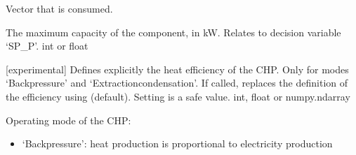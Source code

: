\documentclass[letterpaper,10pt,english]{sphinxmanual}
\begin{document}
\begin{fulllineitems}
\begin{fulllineitems}
\label{\detokenize{generated/tamos.production.CHP:tamos.production.CHP.energy_source}}
\pysigstartsignatures
{}
\pysigstopsignatures
\sphinxAtStartPar
Vector that is consumed.

\end{fulllineitems}


\begin{fulllineitems}
\label{\detokenize{generated/tamos.production.CHP:tamos.production.CHP.given_sizing}}
\pysigstartsignatures
{}
\pysigstopsignatures
\sphinxAtStartPar
The maximum capacity of the component, in kW.
Relates to decision variable ‘SP\_P’.
int or float

\end{fulllineitems}


\begin{fulllineitems}
\label{\detokenize{generated/tamos.production.CHP:tamos.production.CHP.heat_efficiency}}
\pysigstartsignatures
{}
\pysigstopsignatures
\sphinxAtStartPar
{[}experimental{]}
Defines explicitly the heat efficiency of the CHP.
Only for modes ‘Back\sphinxhyphen{}pressure’ and ‘Extraction\sphinxhyphen{}condensation’.
If called, replaces the definition of the efficiency using  (default).
Setting  is a safe value.
int, float or numpy.ndarray

\end{fulllineitems}


\begin{fulllineitems}
\label{\detokenize{generated/tamos.production.CHP:tamos.production.CHP.mode}}
\pysigstartsignatures
{}
\pysigstopsignatures
\sphinxAtStartPar
Operating mode of the CHP:
\begin{itemize}
\item {} 
\sphinxAtStartPar
‘Back\sphinxhyphen{}pressure’: heat production is proportional to electricity production


\end{itemize}
\end{fulllineitems}
\end{fulllineitems}
\end{document}
